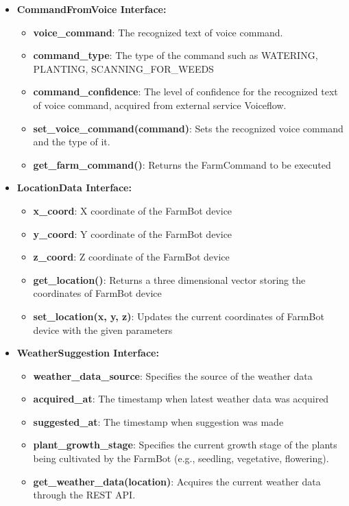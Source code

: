 \begin{itemize}
    \item \textbf{CommandFromVoice Interface:} \begin{itemize}
        \item \textbf{voice\_command}: The recognized text of voice command.
        \item \textbf{command\_type}: The type of the command such as WATERING, PLANTING, SCANNING\_FOR\_WEEDS
        \item \textbf{command\_confidence}: The level of confidence for the recognized text of voice command, acquired from external service Voiceflow.
        \item \textbf{set\_voice\_command(command)}: Sets the recognized voice command and the type of it.
        \item \textbf{get\_farm\_command()}: Returns the FarmCommand to be executed
    \end{itemize}
    \item \textbf{LocationData Interface:} \begin{itemize}
        \item \textbf{x\_coord}: X coordinate of the FarmBot device
        \item \textbf{y\_coord}: Y coordinate of the FarmBot device
        \item \textbf{z\_coord}: Z coordinate of the FarmBot device
        \item \textbf{get\_location()}: Returns a three dimensional vector storing the coordinates of FarmBot device
        \item \textbf{set\_location(x, y, z)}: Updates the current coordinates of FarmBot device with the given parameters 
    \end{itemize}
    \item \textbf{WeatherSuggestion Interface:} \begin{itemize}
        \item \textbf{weather\_data\_source}: Specifies the source of the weather data
        \item \textbf{acquired\_at}: The timestamp when latest weather data was acquired
        \item \textbf{suggested\_at}: The timestamp when suggestion was made
        \item \textbf{plant\_growth\_stage}: Specifies the current growth stage of the plants being cultivated by the FarmBot (e.g., seedling, vegetative, flowering).
        \item \textbf{get\_weather\_data(location)}: Acquires the current weather data through the REST API.

\end{itemize}
\end{itemize}
